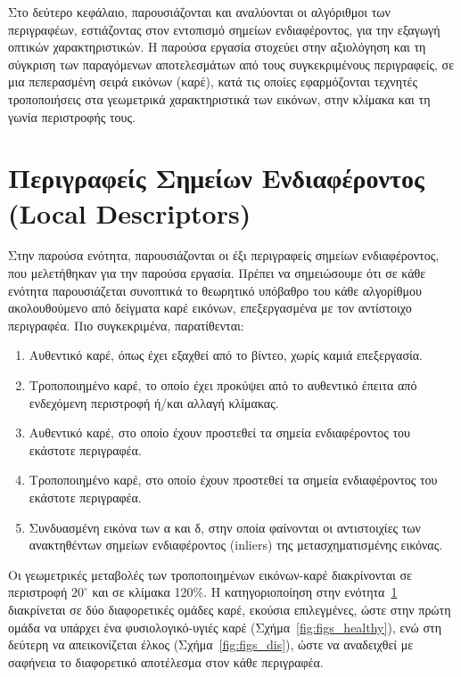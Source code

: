 
Στο δεύτερο κεφάλαιο, παρουσιάζονται και αναλύονται οι αλγόριθμοι των περιγραφέων, εστιάζοντας στον εντοπισμό σημείων ενδιαφέροντος, 
για την εξαγωγή οπτικών χαρακτηριστικών.
Η παρούσα εργασία στοχεύει στην αξιολόγηση και τη σύγκριση των παραγόμενων αποτελεσμάτων από τους συγκεκριμένους περιγραφείς, 
σε μια πεπερασμένη σειρά εικόνων (καρέ), κατά τις οποίες εφαρμόζονται τεχνητές τροποποιήσεις στα γεωμετρικά χαρακτηριστικά των εικόνων, 
στην κλίμακα και τη γωνία περιστροφής τους.

\section{Περιγραφείς Σημείων Ενδιαφέροντος (Local Descriptors)}
\label{sec:local_des}

Στην παρούσα ενότητα, παρουσιάζονται οι έξι περιγραφείς σημείων ενδιαφέροντος, που μελετήθηκαν για την παρούσα εργασία.
Πρέπει να σημειώσουμε ότι σε κάθε ενότητα παρουσιάζεται συνοπτικά το θεωρητικό υπόβαθρο του κάθε αλγορίθμου ακολουθούμενο από δείγματα καρέ εικόνων,
επεξεργασμένα με τον αντίστοιχο περιγραφέα. Πιο συγκεκριμένα, παρατίθενται:

\begin{enumerate}
  

\item Αυθεντικό καρέ, όπως έχει εξαχθεί από το βίντεο, χωρίς καμιά επεξεργασία.
\item Τροποποιημένο καρέ, το οποίο έχει προκύψει από το αυθεντικό έπειτα από ενδεχόμενη περιστροφή ή/και αλλαγή κλίμακας.
\item Αυθεντικό καρέ, στο οποίο έχουν προστεθεί τα σημεία ενδιαφέροντος του εκάστοτε περιγραφέα.
\item Τροποποιημένο καρέ, στο οποίο έχουν προστεθεί τα σημεία ενδιαφέροντος του εκάστοτε περιγραφέα.
\item Συνδυασμένη εικόνα των α και δ, στην οποία φαίνονται οι αντιστοιχίες των ανακτηθέντων σημείων ενδιαφέροντος (inliers) της μετασχηματισμένης εικόνας.


\end{enumerate}

\newpage

Οι γεωμετρικές μεταβολές των τροποποιημένων εικόνων-καρέ διακρίνονται σε περιστροφή $20^{\circ}$ και σε κλίμακα 120\%.
Η κατηγοριοποίηση στην ενότητα~\ref{sec:local_des} διακρίνεται σε δύο διαφορετικές ομάδες καρέ, εκούσια επιλεγμένες, ώστε στην πρώτη ομάδα να υπάρχει ένα φυσιολογικό-υγιές
 καρέ (Σχήμα~\ref{fig:figs_healthy}), ενώ στη δεύτερη να απεικονίζεται έλκος (Σχήμα~\ref{fig:figs_dis}), ώστε να αναδειχθεί με σαφήνεια το διαφορετικό αποτέλεσμα στον κάθε περιγραφέα.\\
 

